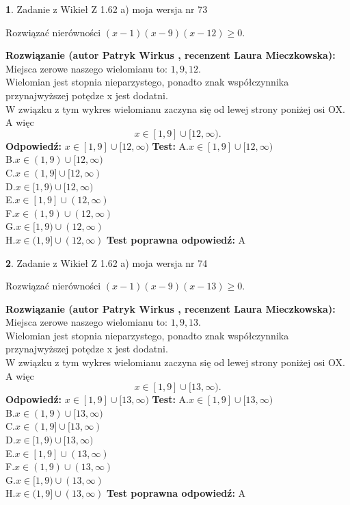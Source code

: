 \documentclass[12pt, a4paper]{article}
\theoremstyle{definition} %
\newtheorem{zad}{}
\newcommand{\zadStart}[1]{\begin{zad}#1\newline}
\newcommand{\zadStop}{\end{zad}}
\newcommand{\rozwStart}[2]{\noindent \textbf{Rozwiązanie (autor #1 , recenzent #2): }\newline}
\newcommand{\rozwStop}{\newline}
\newcommand{\odpStart}{\noindent \textbf{Odpowiedź:}\newline}
\newcommand{\odpStop}{\newline}
\newcommand{\testStart}{\noindent \textbf{Test:}\newline}
\newcommand{\testStop}{\newline}
\newcommand{\kluczStart}{\noindent \textbf{Test poprawna odpowiedź:}\newline}
\newcommand{\kluczStop}{\newline}
\begin{document}
\zadStart{Zadanie z Wikieł Z 1.62 a) moja wersja nr 73}

Rozwiązać nierówności $(x-1)(x-9)(x-12)\ge0$.
\zadStop
\rozwStart{Patryk Wirkus}{Laura Mieczkowska}
Miejsca zerowe naszego wielomianu to: $1, 9, 12$.\\
Wielomian jest stopnia nieparzystego, ponadto znak współczynnika przy\linebreak najwyższej potędze x jest dodatni.\\ W związku z tym wykres wielomianu zaczyna się od lewej strony poniżej osi OX. A więc $$x \in [1,9] \cup [12,\infty).$$
\rozwStop
\odpStart
$x \in [1,9] \cup [12,\infty)$
\odpStop
\testStart
A.$x \in [1,9] \cup [12,\infty)$\\
B.$x \in (1,9) \cup [12,\infty)$\\
C.$x \in (1,9] \cup [12,\infty)$\\
D.$x \in [1,9) \cup [12,\infty)$\\
E.$x \in [1,9] \cup (12,\infty)$\\
F.$x \in (1,9) \cup (12,\infty)$\\
G.$x \in [1,9) \cup (12,\infty)$\\
H.$x \in (1,9] \cup (12,\infty)$
\testStop
\kluczStart
A
\kluczStop



\zadStart{Zadanie z Wikieł Z 1.62 a) moja wersja nr 74}

Rozwiązać nierówności $(x-1)(x-9)(x-13)\ge0$.
\zadStop
\rozwStart{Patryk Wirkus}{Laura Mieczkowska}
Miejsca zerowe naszego wielomianu to: $1, 9, 13$.\\
Wielomian jest stopnia nieparzystego, ponadto znak współczynnika przy\linebreak najwyższej potędze x jest dodatni.\\ W związku z tym wykres wielomianu zaczyna się od lewej strony poniżej osi OX. A więc $$x \in [1,9] \cup [13,\infty).$$
\rozwStop
\odpStart
$x \in [1,9] \cup [13,\infty)$
\odpStop
\testStart
A.$x \in [1,9] \cup [13,\infty)$\\
B.$x \in (1,9) \cup [13,\infty)$\\
C.$x \in (1,9] \cup [13,\infty)$\\
D.$x \in [1,9) \cup [13,\infty)$\\
E.$x \in [1,9] \cup (13,\infty)$\\
F.$x \in (1,9) \cup (13,\infty)$\\
G.$x \in [1,9) \cup (13,\infty)$\\
H.$x \in (1,9] \cup (13,\infty)$
\testStop
\kluczStart
A
\kluczStop
\end{document}
